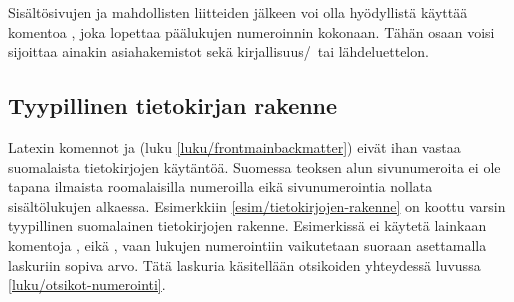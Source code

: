 Sisältösivujen ja mahdollisten liitteiden jälkeen voi olla hyödyllistä
käyttää komentoa , joka lopettaa päälukujen
numeroinnin kokonaan. Tähän osaan voisi sijoittaa ainakin asiahakemistot
sekä kirjallisuus\-/\ tai lähdeluettelon.

\subsection{Tyypillinen tietokirjan rakenne}
\label{luku/tyypillinen-tietokirja}

Latexin komennot  ja  (luku
\ref{luku/frontmainbackmatter}) eivät ihan vastaa suomalaista
tietokirjojen käytäntöä. Suomessa teoksen alun sivunumeroita ei ole
tapana ilmaista roomalaisilla numeroilla eikä sivunumerointia nollata
sisältölukujen alkaessa. Esimerkkiin \ref{esim/tietokirjojen-rakenne} on
koottu varsin tyypillinen suomalainen tietokirjojen rakenne. Esimerkissä
ei käytetä lainkaan komentoja ,
 eikä , vaan lukujen
numerointiin vaikutetaan suoraan asettamalla laskuriin
 sopiva arvo. Tätä laskuria käsitellään otsikoiden
yhteydessä luvussa \ref{luku/otsikot-numerointi}.

